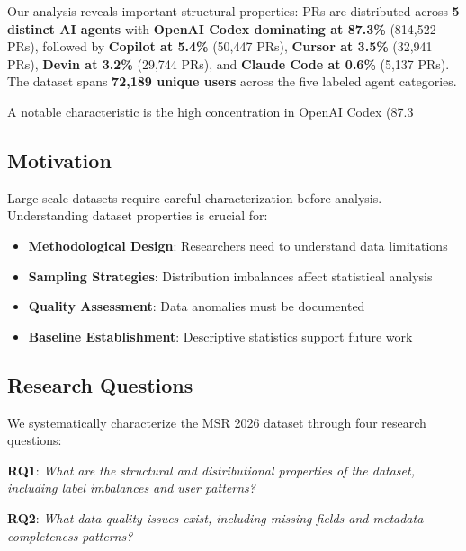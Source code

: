 \documentclass[conference]{IEEEtran}
\begin{document}
Our analysis reveals important structural properties: PRs are distributed across \textbf{5 distinct AI agents} with \textbf{OpenAI Codex dominating at 87.3\%} (814,522 PRs), followed by \textbf{Copilot at 5.4\%} (50,447 PRs), \textbf{Cursor at 3.5\%} (32,941 PRs), \textbf{Devin at 3.2\%} (29,744 PRs), and \textbf{Claude Code at 0.6\%} (5,137 PRs). The dataset spans \textbf{72,189 unique users} across the five labeled agent categories. 

A notable characteristic is the high concentration in OpenAI Codex (87.3%

\subsection{Motivation}

Large-scale datasets require careful characterization before analysis. Understanding dataset properties is crucial for:
\begin{itemize}
    \item \textbf{Methodological Design}: Researchers need to understand data limitations
    \item \textbf{Sampling Strategies}: Distribution imbalances affect statistical analysis
    \item \textbf{Quality Assessment}: Data anomalies must be documented
    \item \textbf{Baseline Establishment}: Descriptive statistics support future work
\end{itemize}

\subsection{Research Questions}

We systematically characterize the MSR 2026 dataset through four research questions:

\textbf{RQ1}: \textit{What are the structural and distributional properties of the dataset, including label imbalances and user patterns?}

\textbf{RQ2}: \textit{What data quality issues exist, including missing fields and metadata completeness patterns?}
\end{document}
